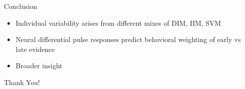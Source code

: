 \documentclass{beamer}
\begin{document}
\begin{frame}{Conclusion}
    \begin{itemize}
        \item Individual variability arises from different mixes of DIM, IIM, SVM
        \item Neural differential pulse responses predict behavioral weighting of early vs late evidence
        \item Broader insight
    \end{itemize}
\end{frame}

\begin{frame}
  \centering
  \Huge{Thank You!}
\end{frame}
\end{document}
